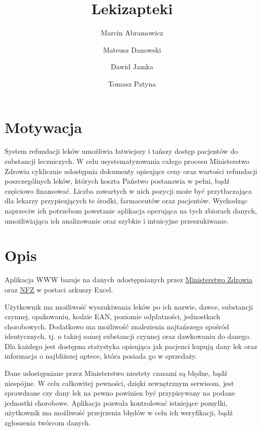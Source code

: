 \documentclass{article}
\title{Lekizapteki}
\author{Marcin Abramowicz \and Mateusz Danowski \and Dawid Jamka \and Tomasz Patyna}
\begin{document}
  \maketitle


  \section{Motywacja}

  System refundacji leków umożliwia łatwiejszy i tańszy dostęp pacjentów do substancji leczniczych.
  W celu usystematyzowania całego procesu Ministerstwo Zdrowia cyklicznie udostępnia dokumenty opisujące ceny oraz wartości refundacji poszczególnych leków, których koszta Państwo postanawia w pełni, bądź częściowo finansować.
  Liczba zawartych w nich pozycji może być przytłaczająca dla lekarzy przypisujących te środki, farmaceutów oraz pacjentów.
  Wychodząc naprzeciw ich potrzebom powstanie aplikacja operująca na tych zbiorach danych, umożliwiająca ich analizowanie oraz szybkie i intuicyjne przeszukiwanie.


  \section{Opis}

  Aplikacja WWW bazuje na danych udostępnianych przez
  \href{https://www.gov.pl/web/zdrowie/obwieszczenia-ministra-zdrowia-lista-lekow-refundowanych?fbclid=IwAR1U3YB3yON5EN2s1qdYRbcIeh7iDxqeOtQoEYGFvX9ozGDWdURIK2JOMRs}
  {Ministerstwo Zdrowia}
  oraz \href{https://www.nfz.gov.pl/aktualnosci/aktualnosci-centrali/komunikat-dgl,7465.html?fbclid=IwAR0F41XjLwTg7XQdUjeYpE_KS4VVZk50etlbYDpwxhxOR2ZLdslMatUtbEU}{NFZ}
  w postaci arkuszy Excel.

  Użytkownik ma możliwość wyszukiwania leków po ich nazwie, dawce, substancji czynnej, opakowaniu, kodzie EAN, poziomie odpłatności, jednostkach chorobowych.
  Dodatkowo ma możliwość znalezienia najtańszego spośród identycznych, tj. o takiej samej substancji czynnej oraz dawkowaniu do danego.
  Dla każdego jest dostępna statystyka opisująca jak pacjenci kupują dany lek oraz informacja o najbliższej aptece, która posiada go w sprzedaży.

  Dane udostępniane przez Ministerstwo niestety czasami są błędne, bądź niespójne.
  W celu całkowitej pewności, dzięki zewnętrznym serwisom, jest sprawdzane czy dany lek na pewno powinien być przypisywany na podane jednostki chorobowe.
  Aplikacja pozwala kontrolować istniejące pomyłki, użytkownik ma możliwość przejrzenia błędów w celu ich weryfikacji, bądź zgłoszenia twórcom danych.
\end{document}
